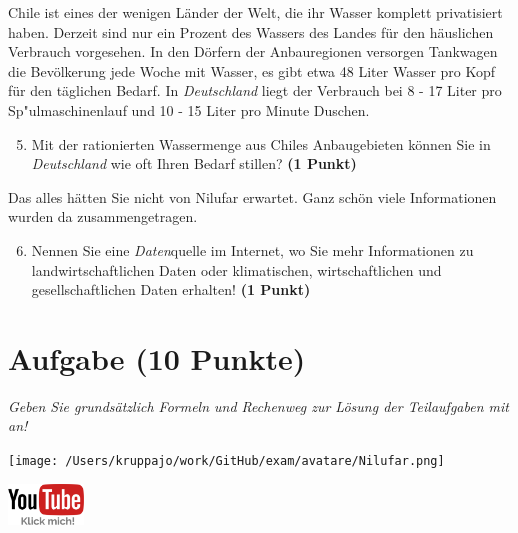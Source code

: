 \documentclass[a4paper, 9pt]{scrartcl}\usepackage[]{graphicx}\usepackage[]{xcolor}
\begin{document}
Chile ist eines der wenigen Länder der Welt, die ihr Wasser komplett privatisiert haben. Derzeit sind nur ein Prozent des Wassers des Landes für den häuslichen Verbrauch vorgesehen. In den Dörfern der Anbauregionen versorgen Tankwagen die Bevölkerung jede Woche mit Wasser, es gibt etwa 48 Liter Wasser pro Kopf für den täglichen Bedarf. In \textit{Deutschland} liegt der Verbrauch bei 8 - 17 Liter pro Sp{"u}lmaschinenlauf und 10 - 15 Liter pro Minute Duschen.

\begin{enumerate}
  \setcounter{enumi}{4}
\item Mit der rationierten Wassermenge aus Chiles Anbaugebieten können Sie in \textit{Deutschland} wie oft Ihren Bedarf stillen? \textbf{(1 Punkt)}
\end{enumerate}

Das alles hätten Sie nicht von Nilufar erwartet. Ganz schön viele Informationen wurden da zusammengetragen.

\begin{enumerate}
  \setcounter{enumi}{5}  
  \item Nennen Sie eine \textit{Daten}quelle im Internet, wo Sie mehr Informationen zu landwirtschaftlichen Daten oder klimatischen, wirtschaftlichen und gesellschaftlichen Daten erhalten! \textbf{(1 Punkt)}
\end{enumerate} 
\clearpage

\section{Aufgabe \hfill (10 Punkte)}

\textit{Geben Sie grundsätzlich Formeln und Rechenweg zur Lösung der Teilaufgaben mit an!} \\[1Ex]
 

 
\ifcollection
\begin{flushright}
\tiny\vspace{-3Ex}
\textbf{\examinhaltstart}
\exammodulemathstat
\vspace{-4Ex}
\end{flushright}
\begin{minipage}[t]{0.5\textwidth}
\texttt{[image: /Users/kruppajo/work/GitHub/exam/avatare/Nilufar.png]}
\end{minipage}
\begin{minipage}[t]{0.5\textwidth}
\hfill
\href{https://youtu.be/WZSxntiNF8s}{\includegraphics[width = 2cm]{img/youtube}}
\end{minipage}
\fi
\end{document}
